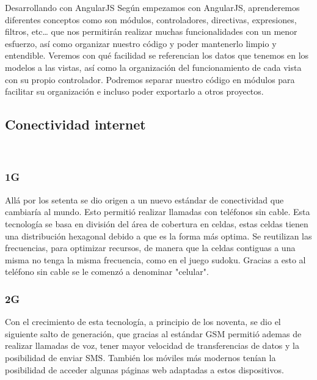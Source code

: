 \documentclass[a4paper, 11pt]{article}
\begin{document}
\begin{itemize}
            Desarrollando con AngularJS
            Según empezamos con AngularJS, aprenderemos diferentes conceptos como son
            módulos, controladores, directivas, expresiones, filtros, etc… que nos
            permitirán realizar muchas funcionalidades con un menor esfuerzo, así como
            organizar nuestro código y poder mantenerlo limpio y entendible. Veremos
            con qué facilidad se referencian los datos que tenemos en los modelos a
            las vistas, así como la organización del funcionamiento de cada vista con
            su propio controlador. Podremos separar nuestro código en módulos para
            facilitar su organización e incluso poder exportarlo a otros proyectos.


        \subsection{Conectividad internet}\\
            \subsubsection{1G}
              Allá por los setenta se dio origen a un nuevo estándar de
              conectividad que cambiaría al mundo. Esto permitió realizar llamadas con
              teléfonos sin cable. Esta tecnología se basa en división del
              área de cobertura en celdas, estas celdas tienen una distribución
              hexagonal debido a que es la forma más optima. Se reutilizan las
              frecuencias, para optimizar recursos, de manera que la celdas
              contiguas a una misma no tenga la misma frecuencia, como en el
              juego sudoku. Gracias a esto al teléfono sin cable se le comenzó
              a denominar "celular".\\


            \subsubsection{2G}

              Con el crecimiento de esta tecnología, a principio de los noventa,
              se dio el siguiente salto de generación, que gracias al estándar
              GSM permitió ademas de realizar llamadas de voz, tener mayor
              velocidad de transferencias de datos y la posibilidad de enviar
              SMS. También los móviles más modernos tenían la posibilidad de
              acceder algunas páginas web adaptadas a estos dispositivos.\\


\end{itemize}
\end{document}
